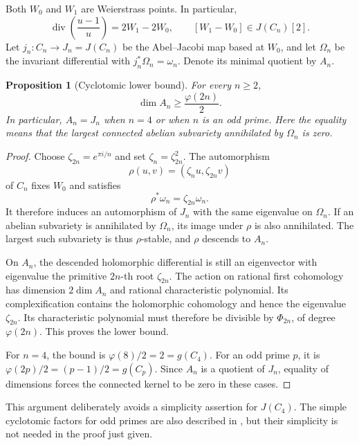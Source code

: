 \documentclass[11pt,a4paper]{article}
\newtheorem{proposition}[theorem]{Proposition}
\theoremstyle{definition}
\theoremstyle{remark}
\numberwithin{equation}{section}
\begin{document}
Both $W_0$ and $W_1$ are Weierstrass points.  In particular,
\begin{equation}\label{tr-endpoint-torsion}
 \operatorname{div}\left(\frac{u-1}{u}\right)=2W_1-2W_0,
 \qquad [W_1-W_0]\in J(C_n)[2].
\end{equation}
Let $j_n:C_n\to J_n=J(C_n)$ be the Abel--Jacobi map based at $W_0$,
and let $\Omega_n$ be the invariant differential with
$j_n^*\Omega_n=\omega_n$.  Denote its minimal quotient by $A_n$.

\begin{proposition}[Cyclotomic lower bound]\label{tr-cyclotomic}
For every $n\geq2$,
\[
 \dim A_n\geq\frac{\varphi(2n)}2.
\]
In particular, $A_n=J_n$ when $n=4$ or when $n$ is an odd prime.
Here the equality means that the largest connected abelian subvariety
annihilated by $\Omega_n$ is zero.
\end{proposition}

\begin{proof}
Choose $\zeta_{2n}=e^{\pi i/n}$ and set $\zeta_n=\zeta_{2n}^2$.
The automorphism
\[
 \rho(u,v)=(\zeta_nu,\zeta_{2n}v)
\]
of $C_n$ fixes $W_0$ and satisfies
\begin{equation}\label{tr-eigenform}
 \rho^*\omega_n=\zeta_{2n}\omega_n.
\end{equation}
It therefore induces an automorphism of $J_n$ with the same
eigenvalue on $\Omega_n$.  If an abelian subvariety is annihilated by
$\Omega_n$, its image under $\rho$ is also annihilated.  The largest
such subvariety is thus $\rho$-stable, and $\rho$ descends to $A_n$.

On $A_n$, the descended holomorphic differential is still an
eigenvector with eigenvalue the primitive $2n$-th root $\zeta_{2n}$.
The action on rational first cohomology has dimension $2\dim A_n$
and rational characteristic polynomial.  Its complexification contains
the holomorphic cohomology and hence the eigenvalue $\zeta_{2n}$.
Its characteristic polynomial must therefore be divisible by
$\Phi_{2n}$, of degree $\varphi(2n)$.  This proves the lower bound.

For $n=4$, the bound is $\varphi(8)/2=2=g(C_4)$.  For an odd prime
$p$, it is $\varphi(2p)/2=(p-1)/2=g(C_p)$.  Since $A_n$ is a quotient
of $J_n$, equality of dimensions forces the connected kernel to be
zero in these cases.
\end{proof}

This argument deliberately avoids a simplicity assertion for $J(C_4)$.
The simple cyclotomic factors for odd primes are also described in
\cite[Proposition~4.8]{lm-Tamiozzo}, but their simplicity is not needed
in the proof just given.
\end{document}
